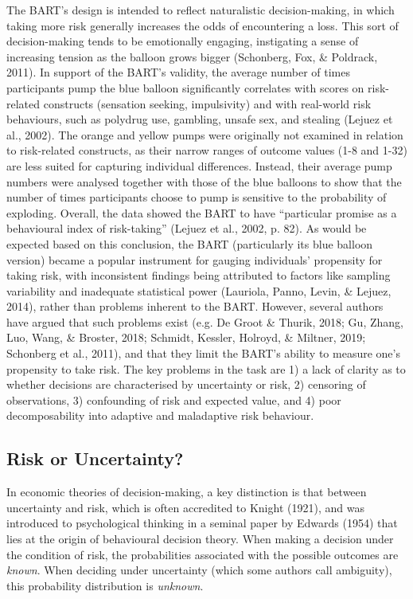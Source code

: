\documentclass[serif, twocolumn, review]{jote-article}
\begin{document}
The BART's design is intended to reflect naturalistic decision-making, in which taking more risk generally increases the odds of encountering a loss. This sort of decision-making tends to be emotionally engaging, instigating a sense of increasing tension as the balloon grows bigger (Schonberg, Fox, \& Poldrack, 2011). In support of the BART's validity, the average number of times participants pump the blue balloon significantly correlates with scores on risk-related constructs (sensation seeking, impulsivity) and with real-world risk behaviours, such as polydrug use, gambling, unsafe sex, and stealing (Lejuez et al., 2002). The orange and yellow pumps were originally not examined in relation to risk-related constructs, as their narrow ranges of outcome values (1-8 and 1-32) are less suited for capturing individual differences. Instead, their average pump numbers were analysed together with those of the blue balloons to show that the number of times participants choose to pump is sensitive to the probability of exploding. Overall, the data showed the BART to have ``particular promise as a behavioural index of risk-taking'' (Lejuez et al., 2002, p. 82). As would be expected based on this conclusion, the BART (particularly its blue balloon version) became a popular instrument for gauging individuals' propensity for taking risk, with inconsistent findings being attributed to factors like sampling variability and inadequate statistical power (Lauriola, Panno, Levin, \& Lejuez, 2014), rather than problems inherent to the BART. However, several authors have argued that such problems exist (e.g. De Groot \& Thurik, 2018; Gu, Zhang, Luo, Wang, \& Broster, 2018; Schmidt, Kessler, Holroyd, \& Miltner, 2019; Schonberg et al., 2011), and that they limit the BART's ability to measure one's propensity to take risk. The key problems in the task are 1) a lack of clarity as to whether decisions are characterised by uncertainty or risk, 2) censoring of observations, 3) confounding of risk and expected value, and 4) poor decomposability into adaptive and maladaptive risk behaviour.

{}
\subsection*{Risk or Uncertainty?}
\gotoreview
\label{sec:risk}

In economic theories of decision-making, a key distinction is that between uncertainty and risk, which is often accredited to Knight (1921), and was introduced to psychological thinking in a seminal paper by Edwards (1954) that lies at the origin of behavioural decision theory. When making a decision under the condition of risk, the probabilities associated with the possible outcomes are \textit{known}. When deciding under uncertainty (which some authors call ambiguity), this probability distribution is \textit{unknown}.
\end{document}
